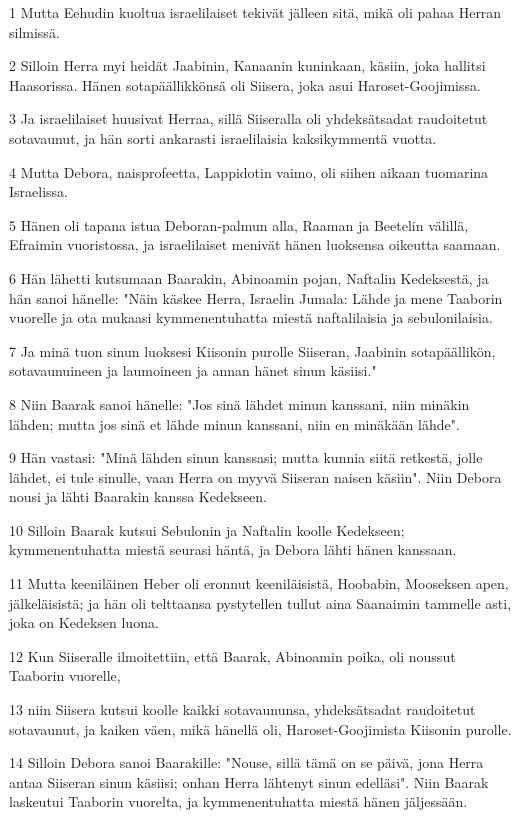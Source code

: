 \par 1 Mutta Eehudin kuoltua israelilaiset tekivät jälleen sitä, mikä oli pahaa Herran silmissä.
\par 2 Silloin Herra myi heidät Jaabinin, Kanaanin kuninkaan, käsiin, joka hallitsi Haasorissa. Hänen sotapäällikkönsä oli Siisera, joka asui Haroset-Goojimissa.
\par 3 Ja israelilaiset huusivat Herraa, sillä Siiseralla oli yhdeksätsadat raudoitetut sotavaunut, ja hän sorti ankarasti israelilaisia kaksikymmentä vuotta.
\par 4 Mutta Debora, naisprofeetta, Lappidotin vaimo, oli siihen aikaan tuomarina Israelissa.
\par 5 Hänen oli tapana istua Deboran-palmun alla, Raaman ja Beetelin välillä, Efraimin vuoristossa, ja israelilaiset menivät hänen luoksensa oikeutta saamaan.
\par 6 Hän lähetti kutsumaan Baarakin, Abinoamin pojan, Naftalin Kedeksestä, ja hän sanoi hänelle: "Näin käskee Herra, Israelin Jumala: Lähde ja mene Taaborin vuorelle ja ota mukaasi kymmenentuhatta miestä naftalilaisia ja sebulonilaisia.
\par 7 Ja minä tuon sinun luoksesi Kiisonin purolle Siiseran, Jaabinin sotapäällikön, sotavaunuineen ja laumoineen ja annan hänet sinun käsiisi."
\par 8 Niin Baarak sanoi hänelle: "Jos sinä lähdet minun kanssani, niin minäkin lähden; mutta jos sinä et lähde minun kanssani, niin en minäkään lähde".
\par 9 Hän vastasi: "Minä lähden sinun kanssasi; mutta kunnia siitä retkestä, jolle lähdet, ei tule sinulle, vaan Herra on myyvä Siiseran naisen käsiin". Niin Debora nousi ja lähti Baarakin kanssa Kedekseen.
\par 10 Silloin Baarak kutsui Sebulonin ja Naftalin koolle Kedekseen; kymmenentuhatta miestä seurasi häntä, ja Debora lähti hänen kanssaan.
\par 11 Mutta keeniläinen Heber oli eronnut keeniläisistä, Hoobabin, Mooseksen apen, jälkeläisistä; ja hän oli telttaansa pystytellen tullut aina Saanaimin tammelle asti, joka on Kedeksen luona.
\par 12 Kun Siiseralle ilmoitettiin, että Baarak, Abinoamin poika, oli noussut Taaborin vuorelle,
\par 13 niin Siisera kutsui koolle kaikki sotavaununsa, yhdeksätsadat raudoitetut sotavaunut, ja kaiken väen, mikä hänellä oli, Haroset-Goojimista Kiisonin purolle.
\par 14 Silloin Debora sanoi Baarakille: "Nouse, sillä tämä on se päivä, jona Herra antaa Siiseran sinun käsiisi; onhan Herra lähtenyt sinun edelläsi". Niin Baarak laskeutui Taaborin vuorelta, ja kymmenentuhatta miestä hänen jäljessään.
